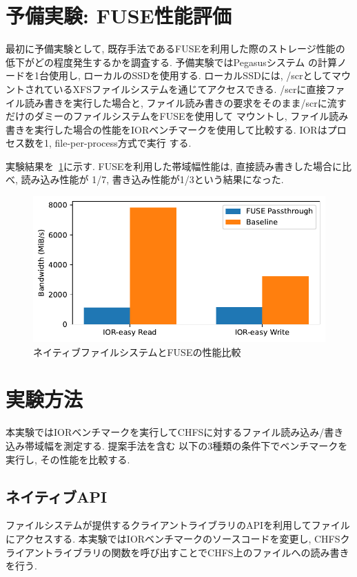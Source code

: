 \documentclass[a4paper,11pt]{jreport}
\begin{document}
\section{予備実験: FUSE性能評価}
最初に予備実験として, 既存手法であるFUSEを利用した際のストレージ性能の低下がどの程度発生するかを調査する. 予備実験ではPegasusシステム
の計算ノードを1台使用し, ローカルのSSDを使用する. ローカルSSDには, /scrとしてマウントされているXFSファイルシステムを通じてアクセスできる.
/scrに直接ファイル読み書きを実行した場合と, ファイル読み書きの要求をそのまま/scrに流すだけのダミーのファイルシステムをFUSEを使用して
マウントし, ファイル読み書きを実行した場合の性能をIORベンチマークを使用して比較する. IORはプロセス数を1, file-per-process方式で実行
する. 

実験結果を\figurename~\ref{fig:FUSE Performance}に示す. FUSEを利用した帯域幅性能は, 直接読み書きした場合に比べ, 読み込み性能が
1/7, 書き込み性能が1/3という結果になった. 

\newpage

\begin{figure}[h]
	\begin{minipage}[b]{1\columnwidth}
		\centering
		\includegraphics[width=0.9\linewidth]{./figure/fuse_overhead.ssd.pdf}
		\caption{ネイティブファイルシステムとFUSEの性能比較}
		\label{fig:FUSE Performance}
	\end{minipage}
\end{figure}
\section{実験方法}
本実験ではIORベンチマークを実行してCHFSに対するファイル読み込み/書き込み帯域幅を測定する. 提案手法を含む
以下の3種類の条件下でベンチマークを実行し, その性能を比較する. 

\subsection{ネイティブAPI}
ファイルシステムが提供するクライアントライブラリのAPIを利用してファイルにアクセスする. 本実験ではIORベンチマークのソースコードを変更し, 
CHFSクライアントライブラリの関数を呼び出すことでCHFS上のファイルへの読み書きを行う. 
\end{document}
